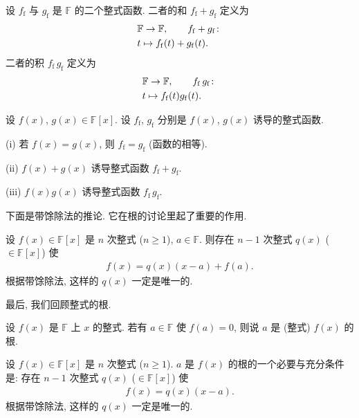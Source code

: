 \begin{definition}
    设 $f_\mathrm{f}$ 与 $g_\mathrm{f}$ 是 $\mathbb{F}$ 的二个整式函数. 二者的和 $f_\mathrm{f} + g_\mathrm{f}$ 定义为
    \begin{align*}
         & \mathbb{F} \to \mathbb{F}, \tag*{$f_\mathrm{f} + g_\mathrm{f} \colon$} \\
         & t \mapsto f_\mathrm{f} (t) + g_\mathrm{f} (t).
    \end{align*}
    二者的积 $f_\mathrm{f} \, g_\mathrm{f}$ 定义为
    \begin{align*}
         & \mathbb{F} \to \mathbb{F}, \tag*{$f_\mathrm{f} \, g_\mathrm{f} \colon$} \\
         & t \mapsto f_\mathrm{f} (t) g_\mathrm{f} (t).
    \end{align*}
\end{definition}

\begin{proposition}
    设 $f(x)$, $g(x) \in \mathbb{F}[x]$. 设 $f_\mathrm{f}$, $g_\mathrm{f}$ 分别是 $f(x)$, $g(x)$ 诱导的整式函数.

    (i) 若 $f(x) = g(x)$, 则 $f_\mathrm{f} = g_\mathrm{f}$ (函数的相等).

    (ii) $f(x) + g(x)$ 诱导整式函数 $f_\mathrm{f} + g_\mathrm{f}$.

    (iii) $f(x) g(x)$ 诱导整式函数 $f_\mathrm{f} \, g_\mathrm{f}$.
\end{proposition}

下面是带馀除法的推论. 它在根的讨论里起了重要的作用.
\begin{proposition}
    设 $f(x) \in \mathbb{F}[x]$ 是 $n$ 次整式 ($n \geq 1$), $a \in \mathbb{F}$. 则存在 $n-1$ 次整式 $q(x)$ ($\in \mathbb{F}[x]$) 使
    \begin{align*}
        f(x) = q(x) (x-a) + f(a).
    \end{align*}
    根据带馀除法, 这样的 $q(x)$ 一定是唯一的.
\end{proposition}

最后, 我们回顾整式的根.

\begin{definition}
    设 $f(x)$ 是 $\mathbb{F}$ 上 $x$ 的整式. 若有 $a \in \mathbb{F}$ 使 $f(a) = 0$, 则说 $a$ 是 (整式) $f(x)$ 的根.
\end{definition}

\begin{proposition}
    设 $f(x) \in \mathbb{F}[x]$ 是 $n$ 次整式 ($n \geq 1$). $a$ 是 $f(x)$ 的根的一个必要与充分条件是: 存在 $n-1$ 次整式 $q(x)$ ($\in \mathbb{F}[x]$) 使
    \begin{align*}
        f(x) = q(x) (x-a).
    \end{align*}
    根据带馀除法, 这样的 $q(x)$ 一定是唯一的.
\end{proposition}

